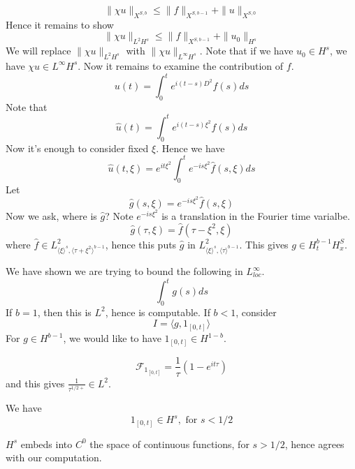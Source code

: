 \begin{equation*}
    \|\chi u\|_{X^{S,b}}\leq \|f\|_{X^{S,b-1}}+\|u\|_{X^{S,0}}
\end{equation*}
Hence it remains to show
\begin{equation*}
    \|\chi u\|_{L^2H^s}\leq\|f\|_{X^{S,b-1}}+\|u_0\|_{H^s}
\end{equation*}
We will replace $\|\chi u\|_{L^2H^s}$ with $\|\chi u\|_{L^\infty H^s}$.
Note that if we have $u_0\in H^s$, we have $\chi u\in L^\infty H^s$. Now it remains to examine the contribution of $f$.
\begin{equation*}
    u(t)=\int_0^t e^{i(t-s)D^2}f(s)ds
\end{equation*}
Note that
\begin{equation*}
    \widehat{u}(t)=\int_0^t e^{i(t-s)\xi^2}\widehat{f}(s)ds
\end{equation*}
Now it's enough to consider fixed $\xi$. Hence we have
\begin{equation*}
    \widehat{u}(t,\xi)=e^{it\xi^2}\int_0^t e^{-is\xi^2}\widehat{f}(s,\xi)ds
\end{equation*}
Let
\begin{equation*}
    \widehat{g}(s,\xi)=e^{-is\xi^2}\widehat{f}(s,\xi)
\end{equation*}
Now we ask, where is $\widehat{g}$?
Note $e^{-is\xi^2}$ is a translation in the Fourier time varialbe.
\begin{equation*}
    \widehat{g}(\tau,\xi)=\widehat{f}(\tau-\xi^2,\xi)
\end{equation*}
where $\widehat{f}\in L_{\langle\xi\rangle^s, \langle\tau+\xi^2\rangle^{b-1}}^2$, hence this puts $\widehat{g}$ in $L_{\langle\xi\rangle^s, \langle\tau\rangle^{b-1}}^2$. This gives $g\in H_t^{b-1}H_x^S$.

We have shown we are trying to bound the following in $L_{loc}^\infty$.
\begin{equation*}
    \int_0^tg(s)ds
\end{equation*}
If $b=1$, then this is $L^2$, hence is computable. If $b<1$, consider
\begin{equation*}
    I=\langle g, 1_{[0,t]}\rangle
\end{equation*}
For $g\in H^{b-1}$, we would like to have $1_{[0,t]}\in H^{1-b}$.

\begin{equation*}
    \mathcal{F}_{1_{[0,t]}}=\frac{1}{\tau}(1-e^{it\tau})
\end{equation*}
and this gives $\frac{1}{\tau^{1/2+}}\in L^2$.
\begin{proposition}
    We have
    \begin{equation*}
        1_{[0,t]}\in H^s, \text{ for } s<1/2
    \end{equation*}
\end{proposition}
\begin{remark}
$H^s$ embeds into $C^0$ the space of continuous functions, for $s>1/2$, hence agrees with our computation.
\end{remark}

